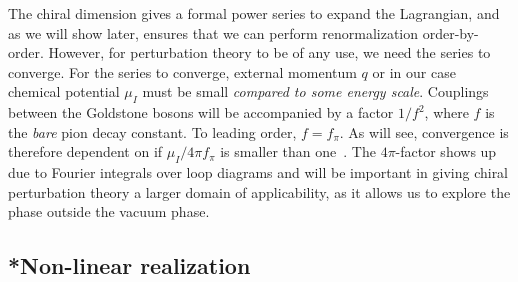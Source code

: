 The chiral dimension gives a formal power series to expand the Lagrangian, and as we will show later, ensures that we can perform renormalization order-by-order.
However, for perturbation theory to be of any use, we need the series to converge.
For the series to converge, external momentum $q$ or in our case chemical potential $\mu_I$ must be small \emph{compared to some energy scale}.
Couplings between the Goldstone bosons will be accompanied by a factor $1/f^2$, where $f$ is the \emph{bare} pion decay constant.
To leading order, $f = f_\pi$.
As will see, convergence is therefore dependent on if $\mu_I / 4 \pi f_\pi$ is smaller than one~\autocite{weinbergQuantumTheoryFields1996}.
The $4\pi$-factor shows up due to Fourier integrals over loop diagrams and will be important in giving chiral perturbation theory a larger domain of applicability, as it allows us to explore the phase outside the vacuum phase.



\subsection{*Non-linear realization}
\label{subsection: non-linear realization}


